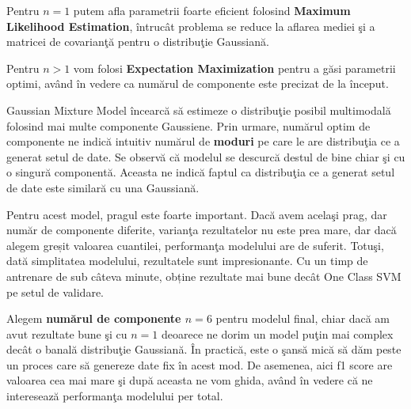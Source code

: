 Pentru $n=1$ putem afla parametrii foarte eficient folosind 
\textbf{Maximum Likelihood Estimation}, întrucât problema 
se reduce la aflarea mediei şi a matricei de 
covarianţă pentru o distribuţie Gaussiană. 

Pentru $n > 1$ vom folosi \textbf{Expectation Maximization} 
pentru a găsi parametrii optimi, 
având în vedere ca numărul de componente este precizat de la început.

Gaussian Mixture Model încearcă să estimeze o distribuţie posibil multimodală 
folosind mai multe componente Gaussiene. Prin urmare, numărul optim de componente
ne indică intuitiv numărul de \textbf{moduri} pe care le are distribuţia ce a generat 
setul de date.
Se observă că modelul se descurcă destul de bine chiar şi cu o singură componentă. 
Aceasta ne indică faptul ca distribuţia ce a generat setul de date este 
similară cu una Gaussiană.

Pentru acest model, pragul este foarte important. Dacă avem acelaşi prag,
dar număr de componente diferite, varianţa rezultatelor
nu este prea mare, dar dacă alegem greșit valoarea cuantilei, 
performanţa modelului are de suferit. Totuşi, 
dată simplitatea modelului, rezultatele sunt impresionante.
Cu un timp de antrenare de sub câteva minute, obține rezultate 
mai bune decât One Class SVM pe setul de validare.

Alegem \textbf{numărul de componente $n=6$} pentru modelul final, chiar dacă 
am avut rezultate bune şi cu $n=1$ deoarece ne dorim un model puţin mai complex 
decât o banală distribuţie Gaussiană. În practică, este o şansă mică să dăm peste 
un proces care să genereze date fix în acest mod. De asemenea, aici f1 score are valoarea cea mai mare
şi după aceasta ne vom ghida, având în vedere că ne interesează performanţa modelului 
per total.

